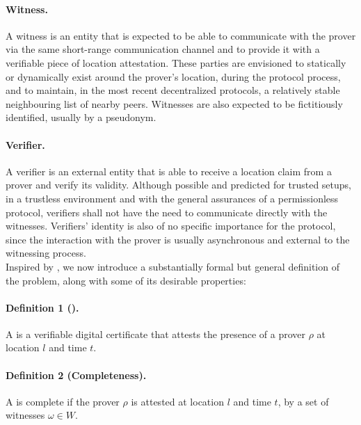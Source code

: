 \paragraph{Witness.} A witness is an entity that is expected to be able to communicate with the prover via the same short-range communication channel and to provide it with a verifiable piece of location attestation. These parties are envisioned to statically or dynamically exist around the prover's location, during the protocol process, and to maintain, in the most recent decentralized protocols, a relatively stable neighbouring list of nearby peers. Witnesses are also expected to be fictitiously identified, usually by a pseudonym.

\paragraph{Verifier.} A verifier is an external entity that is able to receive a location claim from a prover and verify its validity. Although possible and predicted for trusted setups, in a trustless environment and with the general assurances of a permissionless protocol, verifiers shall not have the need to communicate directly with the witnesses. Verifiers' identity is also of no specific importance for the protocol, since the interaction with the prover is usually asynchronous and external to the witnessing process. \\


Inspired by \cite{nasrulin2018robust, dupin2018location}, we now introduce a substantially formal but general definition of the \pol{} problem, along with some of its desirable properties:

\paragraph{Definition 1 (\pol{}).} A \pol{} is a verifiable digital certificate that attests the presence of a prover $\rho$ at location $l$ and time $t$.

\paragraph{Definition 2 (Completeness).} A \pol{} is complete if the prover $\rho$ is attested at location $l$ and time $t$, by a set of witnesses $\omega \in W$.

